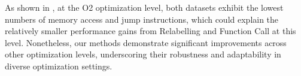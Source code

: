 As shown in , at the O2 optimization level, both datasets exhibit the lowest numbers of memory access and jump instructions, which could explain the relatively smaller performance gains from Relabelling and Function Call at this level. 
Nonetheless, our methods demonstrate significant improvements across other optimization levels, underscoring their robustness and adaptability in diverse optimization settings.


